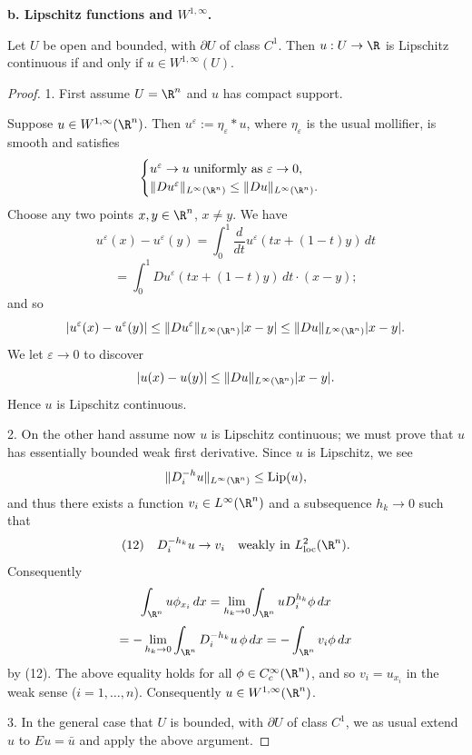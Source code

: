 \textbf{b. Lipschitz functions and $W^{1,\infty}$.}

\begin{theorem}
\label{thm:characterization-w1infty-lipschitz}
Let $U$ be open and bounded, with $\partial U$ of class $C^1$. Then $u : U \to \R$ is Lipschitz continuous if and only if $u \in W^{1,\infty}(U)$.
\end{theorem}

\begin{proof}
1. First assume $U = \R^n$ and $u$ has compact support.

Suppose $u \in W^{1,\infty}(\R^n)$. Then $u^\varepsilon := \eta_\varepsilon * u$, where $\eta_\varepsilon$ is the usual mollifier, is smooth and satisfies
$$\begin{cases}
u^\varepsilon \to u \text{ uniformly as } \varepsilon \to 0, \\
\|Du^\varepsilon\|_{L^\infty(\R^n)} \le \|Du\|_{L^\infty(\R^n)}.
\end{cases}$$
Choose any two points $x, y \in \R^n$, $x \ne y$. We have
$$u^\varepsilon(x) - u^\varepsilon(y) = \int_0^1 \frac{d}{dt} u^\varepsilon(tx + (1-t)y) \, dt$$
$$= \int_0^1 Du^\varepsilon(tx + (1-t)y) \, dt \cdot (x - y);$$
and so
$$|u^\varepsilon(x) - u^\varepsilon(y)| \le \|Du^\varepsilon\|_{L^\infty(\R^n)}|x - y| \le \|Du\|_{L^\infty(\R^n)}|x - y|.$$
We let $\varepsilon \to 0$ to discover
$$|u(x) - u(y)| \le \|Du\|_{L^\infty(\R^n)}|x - y|.$$
Hence $u$ is Lipschitz continuous.

2. On the other hand assume now $u$ is Lipschitz continuous; we must prove that $u$ has essentially bounded weak first derivative. Since $u$ is Lipschitz, we see
$$\|D_i^{-h}u\|_{L^\infty(\R^n)} \le \text{Lip}(u),$$
and thus there exists a function $v_i \in L^\infty(\R^n)$ and a subsequence $h_k \to 0$ such that
$$(12) \quad D_i^{-h_k}u \to v_i \quad \text{weakly in } L^2_{\text{loc}}(\R^n).$$
Consequently
$$\int_{\R^n} u\phi_{x_i}\,dx = \lim_{h_k \to 0} \int_{\R^n} uD_i^{h_k}\phi\,dx$$
$$= -\lim_{h_k \to 0} \int_{\R^n} D_i^{-h_k}u\,\phi\,dx = -\int_{\R^n} v_i\phi\,dx$$
by (12). The above equality holds for all $\phi \in C_c^\infty(\R^n)$, and so $v_i = u_{x_i}$ in the weak sense ($i = 1, \ldots, n$). Consequently $u \in W^{1,\infty}(\R^n)$.

3. In the general case that $U$ is bounded, with $\partial U$ of class $C^1$, we as usual extend $u$ to $Eu = \bar{u}$ and apply the above argument.
\end{proof}

